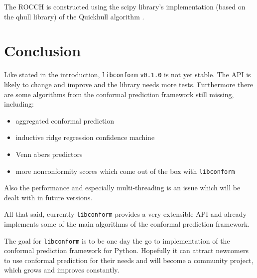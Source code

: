 \documentclass[twoside,11pt]{article}
\def\version{\texttt{v0.1.0}}
\def\libconform{\texttt{libconform}}
\begin{document}
The ROCCH is constructed using the scipy library's
implementation (based on the qhull library) of the
Quickhull algorithm \citep[see][]{scipy,barber_et_al_1996}.

\section{Conclusion}

Like stated in the introduction, \libconform{} \version{}
is not yet stable. The API is likely to change and improve
and the library needs more tests. Furthermore there are
some algorithms from the conformal prediction framework
still missing, including:

\begin{itemize}

  \item aggregated conformal prediction
        \citep[see][]{carlsson_et_al_2014}

  \item inductive ridge regression confidence machine
        \citep[see][]{papadopoulos_et_al_2002}

  \item Venn abers predictors
        \citep[see][]{vovk_et_al_2014}

  \item more nonconformity scores which come out of the box
        with \libconform{}

\end{itemize}
Also the performance and especially multi-threading is an
issue which will be dealt with in future versions.

All that said, currently \libconform{} provides a very
extensible API and already implements some of the main
algorithms of the conformal prediction framework.

The goal for \libconform{} is to be one day
the go to implementation of the conformal prediction
framework for Python. Hopefully it can attract newcomers to
use conformal prediction for their needs and will become a
community project, which grows and improves constantly.
\end{document}
